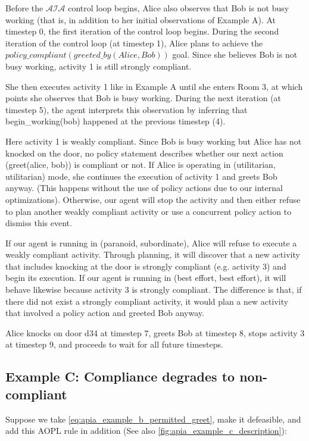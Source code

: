 Before the $\mathcal{AIA}$ control loop begins, Alice also observes that Bob is not busy working (that is, in addition to her initial observations of Example A).
At timestep 0, the first iteration of the control loop begins.
During the second iteration of the control loop (at timestep 1), Alice plans to achieve the $policy\_compliant(greeted\_by(Alice, Bob))$ goal.
Since she believes Bob is not busy working, activity 1 is still strongly compliant.

She then executes activity 1 like in Example A until she enters Room 3, at which points she observes that Bob is busy working.
During the next iteration (at timestep 5), the agent interprets this observation by inferring that begin\_working(bob) happened at the previous timestep (4).

Here activity 1 is weakly compliant.
Since Bob is busy working but Alice has not knocked on the door, no policy statement describes whether our next action (greet(alice, bob)) is compliant or not.
If Alice is operating in (utilitarian, utilitarian) mode, she continues the execution of activity 1 and greets Bob anyway.
(This happens without the use of policy actions due to our internal optimizations).
Otherwise, our agent will stop the activity and then either refuse to plan another weakly compliant activity or use a concurrent policy action to dismiss this event.

If our agent is running in (paranoid, subordinate), Alice will refuse to execute a weakly compliant activity.
Through planning, it will discover that a new activity that includes knocking at the door is strongly compliant (e.g. activity 3) and begin its execution.
If our agent is running in (best effort, best effort), it will behave likewise because activity 3 is strongly compliant.
The difference is that, if there did not exist a strongly compliant activity, it would plan a new activity that involved a policy action and greeted Bob anyway.


Alice knocks on door d34 at timestep 7, greets Bob at timestep 8, stops activity 3 at timestep 9, and proceeds to wait for all future timesteps.

\subsection{Example C: Compliance degrades to non-compliant}

Suppose we take \cref{eq:apia_example_b_permitted_greet}, make it defeasible, and add this AOPL rule in addition (See also \cref{fig:apia_example_c_description}):


